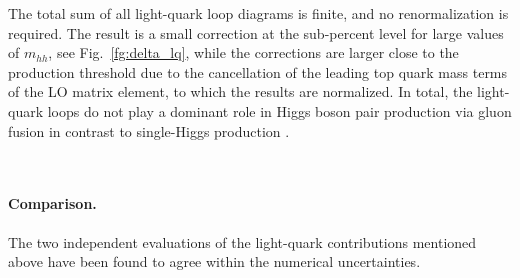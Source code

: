 The total sum of all light-quark loop diagrams is finite, and no renormalization is required. The result is a small correction at the sub-percent level for large values of $m_{hh}$, see Fig.~\ref{fg:delta_lq}, while the corrections are larger close to the production threshold due to the cancellation of the leading top quark mass terms of the LO matrix element, to which the results are normalized. In total, the light-quark loops do not play a dominant role in Higgs boson pair production via gluon fusion in contrast to single-Higgs production \cite{Actis:2008ts,Actis:2008ug}.

~

\paragraph{Comparison.}

The two independent evaluations of the light-quark contributions mentioned above have been found to agree within the numerical uncertainties.
